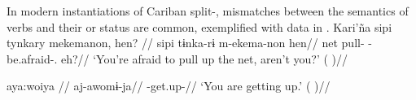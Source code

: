 %
%
%
%


In modern instantiations of Cariban split-, mismatches between the semantics of verbs and their  or  status are common, exemplified with \kalina data in .
%
%
%
\ex Kari'ña    \a \label{kar2}
\begingl \glpreamble sipi tynkary mekemanon, hen? //
\gla sipi tɨnka-rɨ m-ekema-non hen//
\glb net pull- -be.afraid-. eh?//
\glft ‘You're afraid to pull up the net, aren't you?’ (\cite[253]{courtz2008carib}
)//
\endgl

\a \label{kar2}
\begingl \glpreamble aya:woiya //
\gla aj-awomɨ-ja//
\glb {}-get.up-//
\glft ‘You are getting up.’ (\cite[167]{hoff1968carib}
)//
\endgl

